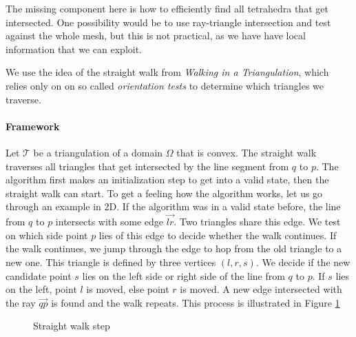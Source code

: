 \documentclass[../thesis.tex]{subfiles}
\begin{document}
The missing component here is how to efficiently find all tetrahedra
that get intersected. One possibility would be to use ray-triangle intersection and
test against the whole mesh, but this is not practical, as we have have local information
that we can exploit.


We use the idea of the straight walk from \emph{Walking in a Triangulation}\cite{Devillers}, which relies only on
on so called \emph{orientation tests} to determine which triangles we traverse.
\paragraph{Framework}
Let $\mathcal{T}$ be a triangulation of a domain $\Omega$ that is convex.
The straight walk traverses all triangles that get intersected by the line segment
from $q$ to $p$. The algorithm first makes an initialization step to get into a valid state, 
then the straight walk can start.
To get a feeling how the algorithm works, let us go through an example in 2D.
If the algorithm was in a valid state before, the line from $q$ to $p$
intersects with some edge $\vec{lr}$. Two triangles share this edge.
We test on which side point $p$ lies of this edge to decide whether the walk continues.
If the walk continues, we jump through the edge to hop from the old triangle to a new one.
This triangle is defined by three vertices $(l,r,s)$. We decide if
the new candidate point $s$ lies on the left side or right side of the line from $q$ to $p$.
If $s$ lies on the left, point $l$ is moved, else point $r$ is moved.
A new edge intersected with the ray $\vec{qp}$ is found and the walk repeats.
This process is illustrated in Figure \ref{fig:straight-walk-2d}
\begin{figure}[htb]
  \centering
  \def\svgwidth{35em}
  
  \caption{Straight walk step}\label{fig:straight-walk-2d}        
\end{figure}
\end{document}
